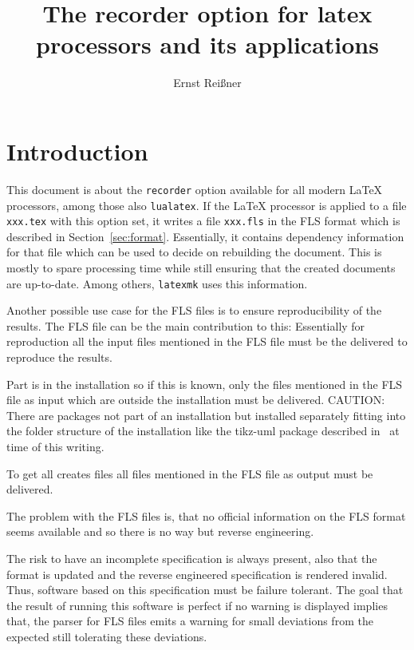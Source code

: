 \documentclass[a4paper, english]{article}%
\title{The recorder option for latex processors and its applications}
\author{Ernst Reißner}
\date{\Today}
\begin{document}
\maketitle
\tableofcontents

\section{Introduction}\label{sec:intro}

This document is about the \texttt{recorder} option available for all modern \LaTeX{} processors, 
among those also \texttt{lualatex}. 
If the \LaTeX{} processor is applied to a file \texttt{xxx.tex} with this option set, 
it writes a file \texttt{xxx.fls} in the FLS format 
which is described in Section~\ref{sec:format}. 
Essentially, it contains dependency information for that file 
which can be used to decide on rebuilding the document. 
This is mostly to spare processing time 
while still ensuring that the created documents are up-to-date. 
Among others, \texttt{latexmk} uses this information. 

Another possible use case for the FLS files is to ensure reproducibility of the results. 
The FLS file can be the main contribution to this: 
Essentially for reproduction all the input files mentioned in the FLS file 
must be the delivered to reproduce the results. 

Part is in the installation so if this is known, 
only the files mentioned in the FLS file as input which are outside the installation must be delivered. 
CAUTION\@: There are packages not part of an installation 
but installed separately fitting into the folder structure of the installation 
like the tikz-uml package described in~\cite{tikzumlP} at time of this writing. 

To get all creates files all files mentioned in the FLS file as output must be delivered. 
\medskip


The problem with the FLS files is, 
that no official information on the FLS format seems available 
and so there is no way but reverse engineering. 

The risk to have an incomplete specification is always present, 
also that the format is updated and the reverse engineered specification is rendered invalid. 
Thus, software based on this specification must be failure tolerant. 
The goal that the result of running this software is perfect if no warning is displayed 
implies that, the parser for FLS files emits a warning for small deviations from the expected 
still tolerating these deviations. 
\end{document}
